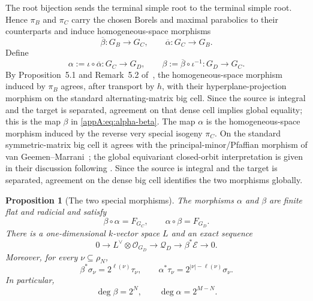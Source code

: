 \documentclass[11pt,a4paper,oneside]{amsart}
\numberwithin{equation}{section}
\newtheorem{proposition}[theorem]{Proposition}
\theoremstyle{definition}
\theoremstyle{remark}
\begin{document}
The root bijection sends the terminal simple root to the terminal simple
root.  Hence $\pi_B$ and $\pi_C$ carry the chosen Borels and maximal
parabolics to their counterparts and induce homogeneous-space morphisms
\[
 \overline\beta:G_B\longrightarrow G_C,
 \qquad
 \overline\alpha:G_C\longrightarrow G_B.
\]
Define
\begin{equation}
\label{appA:eq:alpha-beta}
  \alpha:=\iota\circ\overline\alpha:G_C\longrightarrow G_D,
  \qquad
  \beta:=\overline\beta\circ\iota^{-1}:G_D\longrightarrow G_C.
\end{equation}
By Proposition~5.1 and Remark~5.2 of~\cite{VGM19}, the
homogeneous-space morphism induced by $\pi_B$ agrees, after transport by
$h$, with their hyperplane-projection morphism on the standard
alternating-matrix big cell.  Since the source is integral and the target is separated, agreement on that
dense cell implies global equality; this is the map $\beta$ in
\eqref{appA:eq:alpha-beta}.  The map $\alpha$ is the homogeneous-space
morphism induced by the reverse very special isogeny $\pi_C$.  On the
standard symmetric-matrix big cell it agrees with the
principal-minor/Pfaffian morphism of
van Geemen--Marrani~\cite[Theorem~2.3]{VGM19}; the global equivariant
closed-orbit interpretation is given in their discussion following
\cite[Remark~5.2]{VGM19}.  Since the source is integral and the target is separated, agreement on the
dense big cell identifies the two morphisms globally.


\begin{proposition}[The two special morphisms]
\label{appA:prop:special-morphisms}
The morphisms $\alpha$ and $\beta$ are finite flat and radicial and satisfy
\begin{equation}
\label{appA:eq:Frobenius-factorizations}
  \beta\circ\alpha=F_{G_C},
  \qquad
  \alpha\circ\beta=F_{G_D}.
\end{equation}
There is a one-dimensional $k$-vector space $L$ and an exact sequence
\begin{equation}
\label{appA:eq:bundle-comparison}
  0\longrightarrow L^\vee\otimes\mathcal O_{G_D}
  \longrightarrow\mathcal Q_D
  \longrightarrow\beta^*\mathcal E
  \longrightarrow0.
\end{equation}
Moreover, for every $\nu\subseteq\rho_N$,
\begin{equation}
\label{appA:eq:Schubert-pullbacks}
  \beta^*\sigma_\nu=2^{\ell(\nu)}\tau_\nu,
  \qquad
  \alpha^*\tau_\nu=2^{|\nu|-\ell(\nu)}\sigma_\nu.
\end{equation}
In particular,
\begin{equation}
\label{appA:eq:ambient-degrees}
  \deg\beta=2^N,
  \qquad
  \deg\alpha=2^{M-N}.
\end{equation}
\end{proposition}
\end{document}
